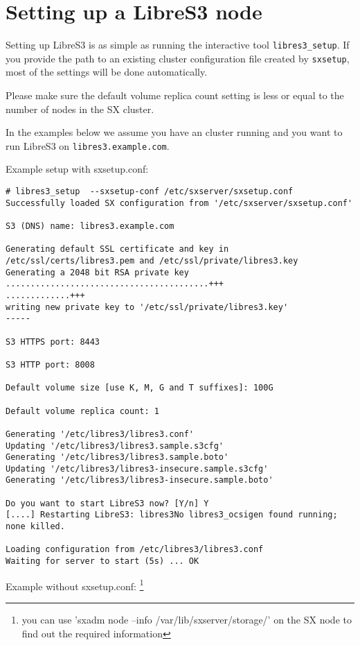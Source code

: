 \section{Setting up a LibreS3 node}

Setting up LibreS3 is as simple as running the interactive tool \verb+libres3_setup+.
If you provide the path to an existing \SX cluster configuration file created
by \verb+sxsetup+, most of the settings will be done automatically.

Please make sure the default volume replica count setting is less or equal
to the number of nodes in the SX cluster.

In the examples below we assume you
have an \SX cluster running and you want to run
LibreS3 on \verb|libres3.example.com|.

Example setup with sxsetup.conf:

\begin{lstlisting}
# libres3_setup  --sxsetup-conf /etc/sxserver/sxsetup.conf
Successfully loaded SX configuration from '/etc/sxserver/sxsetup.conf'

S3 (DNS) name: libres3.example.com

Generating default SSL certificate and key in /etc/ssl/certs/libres3.pem and /etc/ssl/private/libres3.key
Generating a 2048 bit RSA private key
.........................................+++
.............+++
writing new private key to '/etc/ssl/private/libres3.key'
-----

S3 HTTPS port: 8443

S3 HTTP port: 8008

Default volume size [use K, M, G and T suffixes]: 100G

Default volume replica count: 1

Generating '/etc/libres3/libres3.conf'
Updating '/etc/libres3/libres3.sample.s3cfg'
Generating '/etc/libres3/libres3.sample.boto'
Updating '/etc/libres3/libres3-insecure.sample.s3cfg'
Generating '/etc/libres3/libres3-insecure.sample.boto'

Do you want to start LibreS3 now? [Y/n] Y
[....] Restarting LibreS3: libres3No libres3_ocsigen found running; none killed.

Loading configuration from /etc/libres3/libres3.conf
Waiting for server to start (5s) ... OK
\end{lstlisting}


Example without sxsetup.conf:
\footnote{you can use 'sxadm node --info /var/lib/sxserver/storage/' on the SX node to find out the required information}

